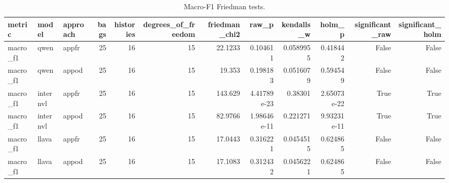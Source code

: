 \begin{table}[tbp]
\caption{Macro-F1 Friedman tests.}
\label{tab:rq3-macro-f1-friedman}
\begin{tabular}{lllrrrrrrrrr}
\toprule
metric & model & approach & bags & histories & degrees\_of\_freedom & friedman\_chi2 & raw\_p & kendalls\_w & holm\_p & significant\_raw & significant\_holm \\
\midrule
macro\_f1 & qwen & appfr & 25 & 16 & 15 & 22.1233 & 0.104611 & 0.0589955 & 0.418442 & False & False \\
macro\_f1 & qwen & appod & 25 & 16 & 15 & 19.353 & 0.198183 & 0.0516079 & 0.594549 & False & False \\
macro\_f1 & internvl & appfr & 25 & 16 & 15 & 143.629 & 4.41789e-23 & 0.38301 & 2.65073e-22 & True & True \\
macro\_f1 & internvl & appod & 25 & 16 & 15 & 82.9766 & 1.98646e-11 & 0.221271 & 9.93231e-11 & True & True \\
macro\_f1 & llava & appfr & 25 & 16 & 15 & 17.0443 & 0.316221 & 0.0454515 & 0.624865 & False & False \\
macro\_f1 & llava & appod & 25 & 16 & 15 & 17.1083 & 0.312432 & 0.0456221 & 0.624865 & False & False \\
\bottomrule
\end{tabular}
\end{table}
